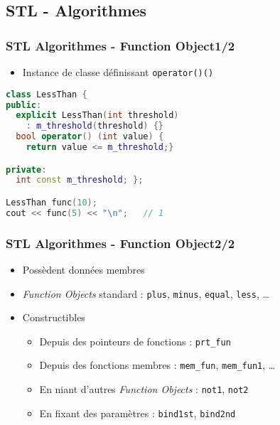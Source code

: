 \documentclass[C++.tex]{subfiles}
\begin{document}
\subsection*{STL - Algorithmes}
\begin{frame}[fragile]
	\frametitle{STL Algorithmes - Function Object\titlehfill{}1/2}
	\begin{itemize}
		\item Instance de classe définissant \lstinline|operator()()|

		\end{itemize}

	\begin{lstlisting}[language=C++]
class LessThan {
public:
  explicit LessThan(int threshold)
    : m_threshold(threshold) {}
  bool operator() (int value) { 
    return value <= m_threshold;}

private:
  int const m_threshold; };

LessThan func(10);
cout << func(5) << "\n";   // 1\end{lstlisting}
\end{frame}

\begin{frame}
	\frametitle{STL Algorithmes - Function Object\titlehfill{}2/2}
	\begin{itemize}
		\item Possèdent données membres


		\item \textit{Function Objects} standard : \lstinline|plus|, \lstinline|minus|, \lstinline|equal|, \lstinline|less|, \ldots
		\item Constructibles
		\begin{itemize}
			\item Depuis des pointeurs de fonctions : \lstinline|prt_fun|
			\item Depuis des fonctions membres : \lstinline|mem_fun|, \lstinline|mem_fun1|, \ldots
			\item En niant d'autres \textit{Function Objects} : \lstinline|not1|, \lstinline|not2|
			\item En fixant des paramètres : \lstinline|bind1st|, \lstinline|bind2nd|
		\end{itemize}
	\end{itemize}
\end{frame}
\end{document}
